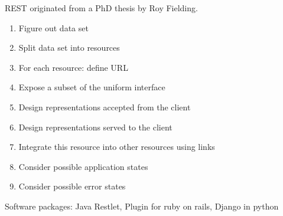 \documentclass[a4paper]{report}
\begin{document}
REST originated from a PhD thesis by Roy Fielding.

\begin{enumerate}
  \item Figure out data set
  \item Split data set into resources
  \item For each resource: define URL
  \item Expose a subset of the uniform interface
  \item Design representations accepted from the client
  \item Design representations served to the client
  \item Integrate this resource into other resources using links
  \item Consider possible application states
  \item Consider possible error states
\end{enumerate}

Software packages: Java Restlet, Plugin for ruby on rails, Django in python
\end{document}
